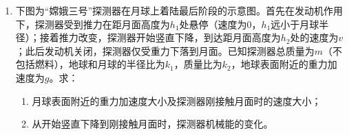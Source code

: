 \begin{enumerate}[leftmargin=0em]
\begin{minipage}[h!]{0.7\linewidth}
\vspace{0.3em}
\end{minipage}
\hfill
\begin{minipage}[h!]{0.3\linewidth}
\flushright
\vspace{0.3em}

\vspace{0.3em}
\end{minipage}



\item 
{}
下图为“嫦娥三号”探测器在月球上着陆最后阶段的示意图。首先在发动机作用下，探测器受到推力在距月面高度为$ h_{1} $处悬停（速度为$ 0 $，$ h_{1} $远小于月球半径）；接着推力改变，探测器开始竖直下降，到达距月面高度为$ h_{2} $处的速度为$ v $；此后发动机关闭，探测器仅受重力下落到月面。已知探测器总质量为$ m $（不包括燃料），地球和月球的半径比为$ k_{1} $，质量比为$ k_{2} $，地球表面附近的重力加速度为$ g $。求： 
\begin{enumerate}
\renewcommand{\labelenumi}{\arabic{enumi}.}
\item
月球表面附近的重力加速度大小及探测器刚接触月面时的速度大小；
\item 
从开始竖直下降到刚接触月面时，探测器机械能的变化。



\end{enumerate}
\begin{figure}[h!]
\flushright

\end{figure}


\end{enumerate}
